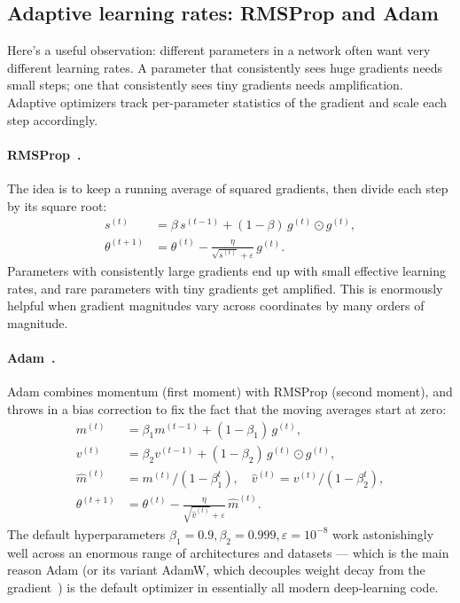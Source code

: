 \documentclass[11pt, a4paper]{article}
\begin{document}
\subsection{Adaptive learning rates: RMSProp and Adam}

Here's a useful observation: different parameters in a network often want very different learning rates. A parameter that consistently sees huge gradients needs small steps; one that consistently sees tiny gradients needs amplification. Adaptive optimizers track per-parameter statistics of the gradient and scale each step accordingly.

\paragraph{RMSProp~\cite{tieleman2012}.} The idea is to keep a running average of squared gradients, then divide each step by its square root:
\begin{align}
    s^{(t)} &= \beta\, s^{(t-1)} + (1 - \beta)\, g^{(t)} \odot g^{(t)}, \\
    \theta^{(t+1)} &= \theta^{(t)} - \frac{\eta}{\sqrt{s^{(t)}} + \varepsilon}\, g^{(t)}.
\end{align}
Parameters with consistently large gradients end up with small effective learning rates, and rare parameters with tiny gradients get amplified. This is enormously helpful when gradient magnitudes vary across coordinates by many orders of magnitude.

\paragraph{Adam~\cite{kingma2014}.} Adam combines momentum (first moment) with RMSProp (second moment), and throws in a bias correction to fix the fact that the moving averages start at zero:
\begin{align}
    m^{(t)} &= \beta_1 m^{(t-1)} + (1 - \beta_1)\, g^{(t)}, \\
    v^{(t)} &= \beta_2 v^{(t-1)} + (1 - \beta_2)\, g^{(t)} \odot g^{(t)}, \\
    \hat m^{(t)} &= m^{(t)} / (1 - \beta_1^t), \quad \hat v^{(t)} = v^{(t)} / (1 - \beta_2^t), \\
    \theta^{(t+1)} &= \theta^{(t)} - \frac{\eta}{\sqrt{\hat v^{(t)}} + \varepsilon}\, \hat m^{(t)}.
\end{align}
The default hyperparameters $\beta_1 = 0.9, \beta_2 = 0.999, \varepsilon = 10^{-8}$ work astonishingly well across an enormous range of architectures and datasets --- which is the main reason Adam (or its variant AdamW, which decouples weight decay from the gradient~\cite{loshchilov2017}) is the default optimizer in essentially all modern deep-learning code.
\end{document}
